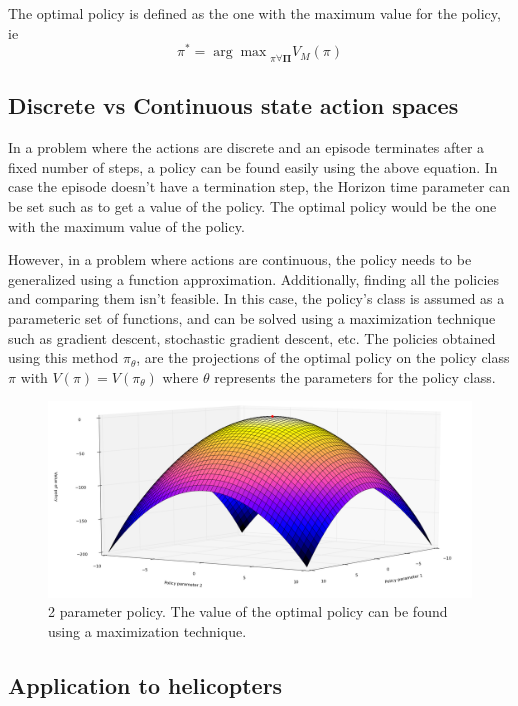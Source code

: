 \documentclass[hidelinks,BTech]{iitmdiss}
\begin{document}
The optimal policy is defined as the one with the maximum value for the policy, ie
\begin{equation}
  \pi^{*} = {\arg \max}_{\pi \forall \mathbf{\Pi}} {V_M(\pi)}
\end{equation}

\subsection*{Discrete vs Continuous state action spaces}
In a problem where the actions are discrete and an episode terminates after a fixed number of steps, a policy can be found easily using the above equation. In case the episode doesn't have a termination step, the Horizon time parameter can be set such as to get a value of the policy. The optimal policy would be the one with the maximum value of the policy.

However, in a problem where actions are continuous, the policy needs to be generalized using a function approximation. Additionally, finding all the policies and comparing them isn't feasible. In this case, the policy's class is assumed as a parameteric set of functions, and can be solved using a maximization technique such as gradient descent, stochastic gradient descent, etc. The policies obtained using this method $\pi_{\theta}$, are the projections of the optimal policy on the policy class $\pi$ with $V(\pi)=V(\pi_{\theta})$ where $\theta$ represents the parameters for the policy class.

\begin{figure}[H]
  \centering
    \includegraphics[width=\textwidth]{gradient_descent.png}
    \caption{2 parameter policy. The value of the optimal policy can be found using a maximization technique.}
\end{figure}

\subsection*{Application to helicopters}
\end{document}
